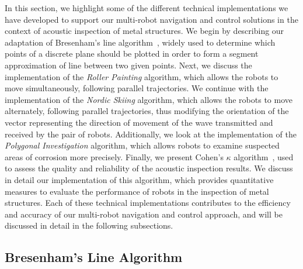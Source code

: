 In this section, we highlight some of the different technical implementations we have developed to support our multi-robot navigation and control solutions in the context of acoustic inspection of metal structures.
We begin by describing our adaptation of Bresenham's line algorithm~\cite{enwiki:1155124335}, widely used to determine which points of a discrete plane should be plotted in order to form a segment approximation of line between two given points.
Next, we discuss the implementation of the \textit{Roller Painting} algorithm, which allows the robots to move simultaneously, following parallel trajectories.
We continue with the implementation of the \textit{Nordic Skiing} algorithm, which allows the robots to move alternately, following parallel trajectories, thus modifying the orientation of the vector representing the direction of movement of the wave transmitted and received by the pair of robots.
Additionally, we look at the implementation of the \textit{Polygonal Investigation} algorithm, which allows robots to examine suspected areas of corrosion more precisely.
Finally, we present Cohen's $\kappa$ algorithm~\cite{enwiki:1130024730}, used to assess the quality and reliability of the acoustic inspection results.
We discuss in detail our implementation of this algorithm, which provides quantitative measures to evaluate the performance of robots in the inspection of metal structures.
Each of these technical implementations contributes to the efficiency and accuracy of our multi-robot navigation and control approach, and will be discussed in detail in the following subsections.

\subsection*{Bresenham's Line Algorithm}\label{subsec:Bresenham}

